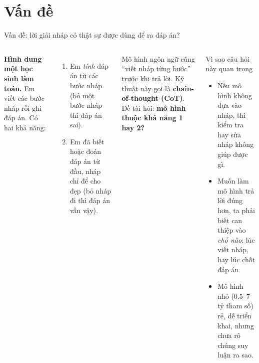 \documentclass[aspectratio=169,t]{beamer}
\begin{document}
\section{Vấn đề}
\begin{frame}[shrink]{Vấn đề: lời giải nháp có thật sự được dùng để ra đáp án?}
\begin{columns}[T,onlytextwidth]
\footnotesize
\textbf{Hình dung một học sinh làm toán.} Em viết các bước nháp rồi ghi đáp án. Có hai khả năng:
\begin{enumerate}
  \setlength{\itemsep}{3pt}
  \item Em \emph{tính} đáp án từ các bước nháp (bỏ một bước nháp thì đáp án sai).
  \item Em đã biết hoặc đoán đáp án từ đầu, nháp chỉ để cho đẹp (bỏ nháp đi thì đáp án vẫn vậy).
\end{enumerate}
\vspace{3pt}
Mô hình ngôn ngữ cũng ``viết nháp từng bước'' trước khi trả lời. Kỹ thuật này gọi là \textbf{chain-of-thought (CoT)}. Đề tài hỏi: \textbf{mô hình thuộc khả năng 1 hay 2?}
\begin{block}{Vì sao câu hỏi này quan trọng}
\footnotesize
\begin{itemize}
  \setlength{\itemsep}{3pt}
  \item Nếu mô hình không dựa vào nháp, thì kiểm tra hay sửa nháp không giúp được gì.
  \item Muốn làm mô hình trả lời đúng hơn, ta phải biết can thiệp vào \emph{chỗ nào}: lúc viết nháp, hay lúc chốt đáp án.
  \item Mô hình nhỏ (0.5--7 tỷ tham số) rẻ, dễ triển khai, nhưng chưa rõ chúng suy luận ra sao.
\end{itemize}
\end{block}
\end{columns}
\par\kern0pt
\end{frame}
\end{document}
